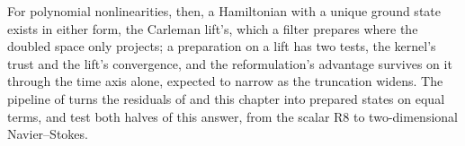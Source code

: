 For polynomial nonlinearities, then, a Hamiltonian with a unique ground state exists in either form, the Carleman lift's, which a filter prepares where the doubled space only projects; a preparation on a lift has two tests, the kernel's trust and the lift's convergence, and the reformulation's advantage survives on it through the time axis alone, expected to narrow as the truncation widens. The pipeline of  turns the residuals of  and this chapter into prepared states on equal terms, and  test both halves of this answer, from the scalar R8 to two-dimensional Navier--Stokes.
